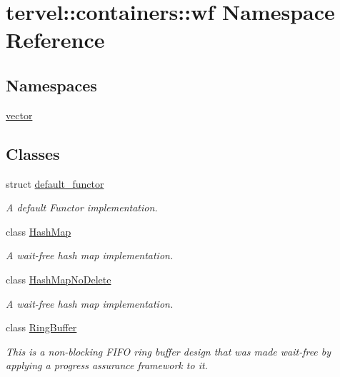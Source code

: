 \hypertarget{namespacetervel_1_1containers_1_1wf}{}\section{tervel\+:\+:containers\+:\+:wf Namespace Reference}
\label{namespacetervel_1_1containers_1_1wf}
\subsection*{Namespaces}
\begin{DoxyCompactItemize}
\item 
 \hyperlink{namespacetervel_1_1containers_1_1wf_1_1vector}{vector}
\end{DoxyCompactItemize}
\subsection*{Classes}
\begin{DoxyCompactItemize}
\item 
struct \hyperlink{structtervel_1_1containers_1_1wf_1_1default__functor}{default\+\_\+functor}
\begin{DoxyCompactList}\small\item\em A default Functor implementation. \end{DoxyCompactList}\item 
class \hyperlink{classtervel_1_1containers_1_1wf_1_1_hash_map}{Hash\+Map}
\begin{DoxyCompactList}\small\item\em A wait-\/free hash map implementation. \end{DoxyCompactList}\item 
class \hyperlink{classtervel_1_1containers_1_1wf_1_1_hash_map_no_delete}{Hash\+Map\+No\+Delete}
\begin{DoxyCompactList}\small\item\em A wait-\/free hash map implementation. \end{DoxyCompactList}\item 
class \hyperlink{classtervel_1_1containers_1_1wf_1_1_ring_buffer}{Ring\+Buffer}
\begin{DoxyCompactList}\small\item\em This is a non-\/blocking F\+I\+F\+O ring buffer design that was made wait-\/free by applying a progress assurance framework to it. \end{DoxyCompactList}\end{DoxyCompactItemize}
